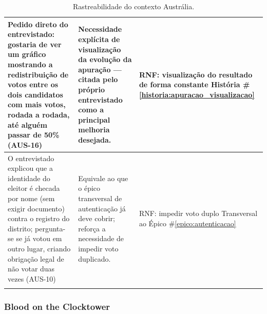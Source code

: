 \documentclass[12pt,a4paper]{article}
\newcounter{epico}
\newcounter{historia}
\begin{document}
\begin{longtable}{|p{7cm}|p{4.5cm}|p{4.5cm}|}
    Pedido direto do entrevistado: gostaria de ver um gráfico mostrando a redistribuição de votos entre os dois candidatos com mais votos, rodada a rodada, até alguém passar de 50\% (AUS-16)
    & Necessidade explícita de visualização da evolução da apuração — citada pelo próprio entrevistado como a principal melhoria desejada.
    & RNF: visualização do resultado de forma constante
    \newline \newline  História \#\ref{historia:apuracao_visualizacao} \\

    \hline
    
    O entrevistado explicou que a identidade do eleitor é checada por nome (sem exigir documento) contra o registro do distrito; pergunta-se se já votou em outro lugar, criando obrigação legal de não votar duas vezes (AUS-10)
    & Equivale ao que o épico transversal de autenticação já deve cobrir; reforça a necessidade de impedir voto duplicado.
    & RNF: impedir voto duplo
    \newline \newline Transversal ao Épico \#\ref{epico:autenticacao} \\
    \hline
    \caption{Rastreabilidade do contexto Austrália.}
\end{longtable}


\subsubsection{Blood on the Clocktower}
\end{document}
